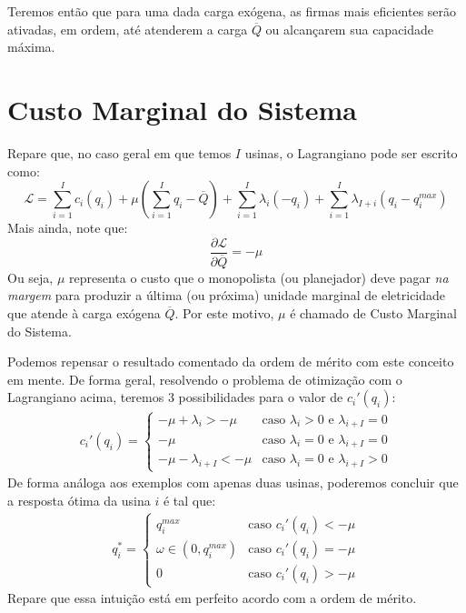 Teremos então que para uma dada carga exógena, as firmas mais eficientes serão ativadas, em ordem, até atenderem a carga $\overline{Q}$ ou alcançarem sua capacidade máxima.

\section{Custo Marginal do Sistema}
Repare que, no caso geral em que temos $I$ usinas, o Lagrangiano pode ser escrito como:
\[\mathcal{L}=\sum_{i=1}^Ic_i(q_i)+\mu\left(\sum_{i=1}^Iq_i-\overline{Q}\right)+\sum_{i=1}^I\lambda_i(-q_i) + \sum_{i=1}^{I}\lambda_{I+i}(q_i-q_i^{max})\]
Mais ainda, note que:
\[\frac{\partial\mathcal{L}}{\partial\overline{Q}}=-\mu\]
Ou seja, $\mu$ representa o custo que o monopolista (ou planejador) deve pagar \textit{na margem} para produzir a última (ou próxima) unidade marginal de eletricidade que atende à carga exógena $\overline{Q}$. Por este motivo, $\mu$ é chamado de Custo Marginal do Sistema.

Podemos repensar o resultado comentado da ordem de mérito com este conceito em mente. De forma geral, resolvendo o problema de otimização com o Lagrangiano acima, teremos 3 possibilidades para o valor de $c_i'(q_i)$:
\begin{align*}
     c_i'(q_i) =\begin{cases}
        -\mu+\lambda_i>-\mu&\text{caso $\lambda_{i}>0$ e $\lambda_{i+I}=0$} \\
        -\mu&\text{caso $\lambda_{i}=0$ e $\lambda_{i+I}=0$} \\
        -\mu-\lambda_{i+I}<-\mu&\text{caso $\lambda_{i}=0$ e $\lambda_{i+I}>0$}
    \end{cases}  
\end{align*}
De forma análoga aos exemplos com apenas duas usinas, poderemos concluir que a resposta ótima da usina $i$ é tal que:
\begin{align*}
    q_i^*=\begin{cases}
        q_i^{max} & \text{caso $c_i'(q_i)<-\mu$}\\
        \omega \in(0,q_i^{max}) & \text{caso $c_i'(q_i)=-\mu$}\\
        0 & \text{caso $c_i'(q_i)>-\mu$}
    \end{cases}
\end{align*}
Repare que essa intuição está em perfeito acordo com a ordem de mérito.


